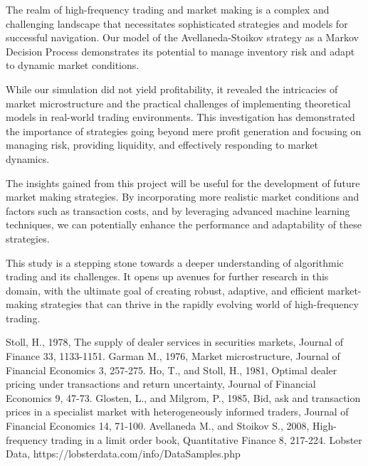 \documentclass[letterpaper, 10 pt, conference]{ieeeconf}  %
\begin{document}

The realm of high-frequency trading and market making is a complex and challenging landscape that necessitates sophisticated strategies and models for successful navigation. Our model of the Avellaneda-Stoikov strategy as a Markov Decision Process demonstrates its potential to manage inventory risk and adapt to dynamic market conditions.

While our simulation did not yield profitability, it revealed the intricacies of market microstructure and the practical challenges of implementing theoretical models in real-world trading environments. This investigation has demonstrated the importance of strategies going beyond mere profit generation and focusing on managing risk, providing liquidity, and effectively responding to market dynamics.

The insights gained from this project will be useful for the development of future market making strategies. By incorporating more realistic market conditions and factors such as transaction costs, and by leveraging advanced machine learning techniques, we can potentially enhance the performance and adaptability of these strategies.

This study is a stepping stone towards a deeper understanding of algorithmic trading and its challenges. It opens up avenues for further research in this domain, with the ultimate goal of creating robust, adaptive, and efficient market-making strategies that can thrive in the rapidly evolving world of high-frequency trading.

\begin{thebibliography}{99}

 Stoll, H., 1978, The supply of dealer services in securities markets, Journal of Finance 33, 1133-1151.
 Garman M., 1976, Market microstructure, Journal of Financial Economics 3, 257-275.
 Ho, T., and Stoll, H., 1981, Optimal dealer pricing under transactions and return uncertainty, Journal of Financial Economics 9, 47-73.
 Glosten, L., and Milgrom, P., 1985, Bid, ask and transaction prices in a specialist market with heterogeneously informed traders, Journal of Financial Economics 14, 71-100.
 Avellaneda M., and Stoikov S., 2008, High-frequency trading in a limit order book, Quantitative Finance 8, 217-224.
 Lobster Data, https://lobsterdata.com/info/DataSamples.php 



\end{thebibliography}
\end{document}
